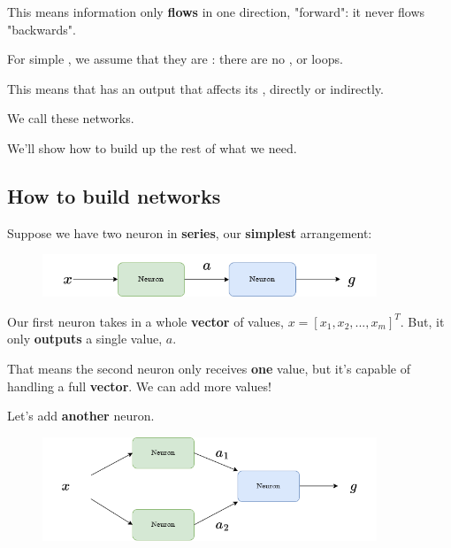         This means information only \textbf{flows} in one direction, "forward": it never flows "backwards".\\
        
        \begin{concept}
            For simple , we assume that they are : there are no , or loops.
            
            This means that  has an output that affects its , directly or indirectly.
            
            We call these  networks.
        \end{concept}
        
        We'll show how to build up the rest of what we need.
    
    \subsection{How to build networks}
        
        Suppose we have two neuron in \textbf{series}, our \textbf{simplest} arrangement:
        
        \begin{figure}[H]
            \centering
            \includegraphics[width=100mm,scale=0.4]{images/nn_images/series_a.png}
        \end{figure}
        
        Our first neuron takes in a whole \textbf{vector} of values, $x = [x_1, x_2, ..., x_m]^T$. But, it only \textbf{outputs} a single value, $a$.
        
        That means the second neuron only receives \textbf{one} value, but it's capable of handling a full \textbf{vector}. We can add more values!
        
        Let's add \textbf{another} neuron.
        
        \begin{figure}[H]
            \centering
            \includegraphics[width=100mm,scale=0.4]{images/nn_images/two_neurons_a.png}
        \end{figure}
        
